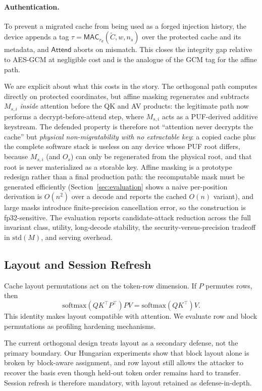 \paragraph{Authentication.} To prevent a migrated cache from being used as a forged injection history, the device appends a tag $\tau=\mathsf{MAC}_{r_d}(\tilde C,w,n_s)$ over the protected cache and its metadata, and $\mathsf{Attend}$ aborts on mismatch. This closes the integrity gap relative to AES-GCM at negligible cost and is the analogue of the GCM tag for the affine path.

We are explicit about what this costs in the \sys{} story. The orthogonal path computes directly on protected coordinates, but affine masking regenerates and subtracts $M_{s,i}$ \emph{inside} attention before the QK and AV products: the legitimate path now performs a decrypt-before-attend step, where $M_{s,i}$ acts as a PUF-derived additive keystream. The defended property is therefore not ``attention never decrypts the cache'' but \emph{physical non-migratability with no extractable key}: a copied cache plus the complete software stack is useless on any device whose PUF root differs, because $M_{s,i}$ (and $O_s$) can only be regenerated from the physical root, and that root is never materialized as a storable key. Affine masking is a prototype redesign rather than a final production path: the recomputable mask must be generated efficiently (Section~\ref{sec:evaluation} shows a naive per-position derivation is $O(n^2)$ over a decode and reports the cached $O(n)$ variant), and large masks introduce finite-precision cancellation error, so the construction is fp32-sensitive. The evaluation reports candidate-attack reduction across the full invariant class, utility, long-decode stability, the security-versus-precision tradeoff in $\mathrm{std}(M)$, and serving overhead.

\subsection{Layout and Session Refresh}

Cache layout permutations act on the token-row dimension. If $P$ permutes rows, then
\begin{equation}
    \mathrm{softmax}(QK^\top P^\top)PV = \mathrm{softmax}(QK^\top)V.
\end{equation}
This identity makes layout compatible with attention. We evaluate row and block permutations as profiling hardening mechanisms.

The current orthogonal design treats layout as a secondary defense, not the primary boundary. Our Hungarian experiments show that block layout alone is broken by block-aware assignment, and row layout still allows the attacker to recover the basis even though held-out token order remains hard to transfer. Session refresh is therefore mandatory, with layout retained as defense-in-depth.

